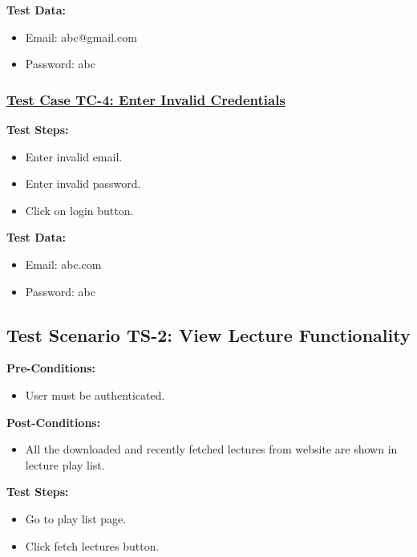 \textbf{Test Data:}
\begin{itemize}

\item Email: abc@gmail.com
\item Password: abc

\end{itemize}

\subsubsection{\underline{Test Case TC-4: Enter Invalid Credentials}}
\textbf{Test Steps:}
\begin{itemize}

\item Enter invalid email.
\item Enter invalid password.
\item Click on login button.

\end{itemize}

\textbf{Test Data:}
\begin{itemize}

\item Email: abc.com
\item Password: abc

\end{itemize}



\subsection{Test Scenario TS-2: View Lecture Functionality}

\textbf{Pre-Conditions: }
\begin{itemize}

\item User must be authenticated.

\end{itemize}


\textbf{Post-Conditions: }
\begin{itemize}

\item All the downloaded and recently fetched lectures from website are shown in lecture play list.

\end{itemize}


\textbf{Test Steps:}
\begin{itemize}

\item Go to play list page.
\item Click fetch lectures button.

\end{itemize}



